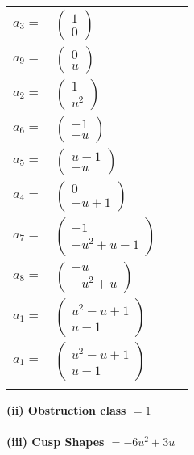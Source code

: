 \documentclass[1p]{elsarticle_modified}
\theoremstyle{definition}
\begin{document}
\begin{tabular}{m{7pt} m{180pt} m{7pt} m{180pt} }
\flushright $a_{3}=$&$\begin{pmatrix}1\\0\end{pmatrix}$ \\
\flushright $a_{9}=$&$\begin{pmatrix}0\\u\end{pmatrix}$ \\
\flushright $a_{2}=$&$\begin{pmatrix}1\\u^2\end{pmatrix}$ \\
\flushright $a_{6}=$&$\begin{pmatrix}-1\\- u\end{pmatrix}$ \\
\flushright $a_{5}=$&$\begin{pmatrix}u-1\\- u\end{pmatrix}$ \\
\flushright $a_{4}=$&$\begin{pmatrix}0\\- u+1\end{pmatrix}$ \\
\flushright $a_{7}=$&$\begin{pmatrix}-1\\- u^2+u-1\end{pmatrix}$ \\
\flushright $a_{8}=$&$\begin{pmatrix}- u\\- u^2+u\end{pmatrix}$ \\
\flushright $a_{1}=$&$\begin{pmatrix}u^2- u+1\\u-1\end{pmatrix}$\\ \flushright $a_{1}=$&$\begin{pmatrix}u^2- u+1\\u-1\end{pmatrix}$\\&\end{tabular}
\flushleft \textbf{(ii) Obstruction class $= 1$}\\~\\
\flushleft \textbf{(iii) Cusp Shapes $= -6 u^2+3 u$}\\~\\
\end{document}

